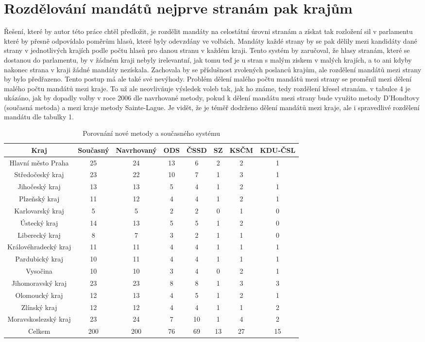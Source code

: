 \documentclass[12pt]{report}
\begin{document}
\section{Rozdělování mandátů nejprve stranám pak krajům}
Řešení, které by autor této práce chtěl předložit, je rozdělit mandáty na celostátní úrovni stranám a získat tak rozložení sil v parlamentu které by přesně odpovídalo poměrům hlasů, které byly odevzdány ve volbách.
Mandáty každé strany by se pak dělily mezi kandidáty dané strany v jednotlivých krajích podle počtu hlasů pro danou stranu v každém kraji.
Tento systém by zaručoval, že hlasy stranám, které se dostanou do parlamentu, by v žádném kraji nebyly irelevantní, jak tomu teď je u stran s malým ziskem v malých krajích, a to ani kdyby nakonec strana v kraji žádné mandáty nezískala.
Zachovala by se příslušnost zvolených poslanců krajům, ale  rozdělení mandátů mezi strany by bylo předřazeno.
Tento postup má ale také své nevýhody.
Problém dělení malého počtu mandátů mezi strany se proměnil mezi dělení malého počtu mandátů mezi kraje.
To už ale neovlivňuje výsledek voleb tak, jak ho známe, tedy rozdělení křesel stranám.
v tabulce 4 je ukázáno, jak by dopadly volby v roce 2006 dle navrhované metody, pokud k dělení mandátu mezi strany bude využito metody D'Hondtovy (současná metoda) a mezi kraje metody Sainte-Lague. Je vidět, že je téměř dodrženo dělení mandátů mezi kraje, ale i spravedlivé rozdělení mandátu dle tabulky 1. 
\begin{table}
\begin{tabular}{|c|c|c|c|c|c|c|c|} 
\hline Kraj & Současný & Navrhovaný & ODS & ČSSD & SZ & KSČM & KDU-ČSL \\
\hline Hlavní město Praha & 25 & 24 & 13 & 6 & 2 & 2 & 1 \\
\hline Středočeský kraj & 23 & 22 & 10 & 7 & 1 & 3 & 1 \\
\hline Jihočeský kraj & 13 & 13 & 5 & 4 & 1 & 2 & 1 \\
\hline Plzeňský kraj & 11 & 12 & 4 & 4 & 1 & 2 & 1 \\
\hline Karlovarský kraj & 5 & 5 & 2 & 2 & 0 & 1 & 0 \\
\hline Ústecký kraj & 14 & 13 & 5 & 5 & 1 & 2 & 0 \\
\hline Liberecký kraj & 8 & 7 & 3 & 2 & 1 & 1 & 0 \\
\hline Královéhradecký kraj & 11 & 11 & 4 & 4 & 1 & 1 & 1 \\
\hline Pardubický kraj & 10 & 11 & 4 & 4 & 1 & 1 & 1 \\
\hline Vysočina & 10 & 10 & 3 & 4 & 0 & 2 & 1 \\
\hline Jihomoravský kraj & 23 & 23 & 8 & 8 & 1 & 3 & 3 \\
\hline Olomoucký kraj & 12 & 13 & 4 & 5 & 1 & 2 & 1 \\
\hline Zlínský kraj & 12 & 12 & 4 & 4 & 1 & 1 & 2 \\
\hline Moravskoslezský kraj & 23 & 24 & 7 & 10 & 1 & 4 & 2 \\
\hline Celkem & 200 & 200 & 76 & 69 & 13 & 27 & 15 \\
\hline
\end{tabular}
\caption{Porovnání nové metody a současného systému}
\end{table}
\newpage
\end{document}

